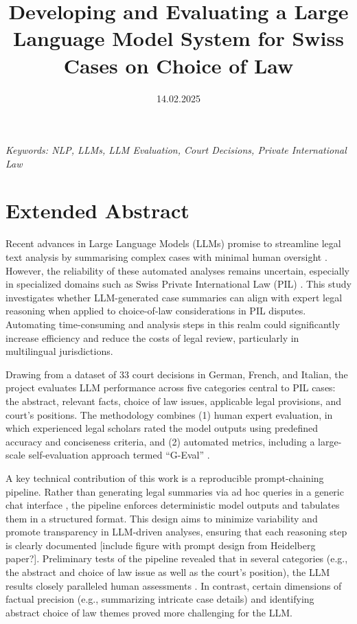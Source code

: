 \documentclass[a4paper,12pt]{article}
\title{Developing and Evaluating a Large Language Model System for Swiss Cases on Choice of Law}
\date{14.02.2025}
\begin{document}
\maketitle
\thispagestyle{fancy}

\begin{center}
\textit{Keywords: NLP, LLMs, LLM Evaluation, Court Decisions, Private International Law}
\newline
\end{center}

\section*{Extended Abstract}

Recent advances in Large Language Models (LLMs) promise to streamline legal text analysis by summarising complex cases with minimal human oversight \cite{pereira_inacia_2024}. However, the reliability of these automated analyses remains uncertain, especially in specialized domains such as Swiss Private International Law (PIL) \cite{}. This study investigates whether LLM-generated case summaries can align with expert legal reasoning when applied to choice-of-law considerations in PIL disputes. Automating time-consuming and analysis steps in this realm could significantly increase efficiency and reduce the costs of legal review, particularly in multilingual jurisdictions.

Drawing from a dataset of 33 court decisions in German, French, and Italian, the project evaluates LLM performance across five categories central to PIL cases: the abstract, relevant facts, choice of law issues, applicable legal provisions, and court's positions. The methodology combines (1) human expert evaluation, in which experienced legal scholars rated the model outputs using predefined accuracy and conciseness criteria, and (2) automated metrics, including a large-scale self-evaluation approach termed ``G-Eval'' \cite{liu2023gevalnlgevaluationusing}.

A key technical contribution of this work is a reproducible prompt-chaining pipeline. Rather than generating legal summaries via ad hoc queries in a generic chat interface \cite{qin_is_2023}, the pipeline enforces deterministic model outputs \cite{} and tabulates them in a structured format. This design aims to minimize variability and promote transparency in LLM-driven analyses, ensuring that each reasoning step is clearly documented [include figure with prompt design from Heidelberg paper?]. Preliminary tests of the pipeline revealed that in several categories (e.g., the abstract and choice of law issue as well as the court's position), the LLM results closely paralleled human assessments \cite{Heidelberg [ask AB, which categories were particularly good/bad]}. In contrast, certain dimensions of factual precision (e.g., summarizing intricate case details) and identifying abstract choice of law themes proved more challenging for the LLM.
\end{document}
